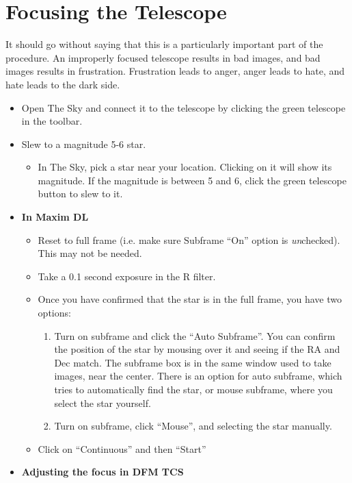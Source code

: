 \documentclass[letterpaper, 12pt]{report}
\begin{document}
\newpage

\chapter{Focusing the Telescope}
\label{ch:focusing}
It should go without saying that this is a particularly important part of the procedure. An improperly focused telescope results in bad images, and bad images results in frustration. Frustration leads to anger, anger leads to hate, and hate leads to the dark side.

\begin{itemize}
	\item Open The Sky and connect it to the telescope by clicking the green telescope in the toolbar.
	\item Slew to a magnitude 5-6 star.
	\begin{itemize}
		\item In The Sky, pick a star near your location. Clicking on it will show its magnitude. If the magnitude is between 5 and 6, click the green telescope button to slew to it.
	\end{itemize}
	\item {\large \textbf{In Maxim DL}}
	\begin{itemize}
		\item Reset to full frame (i.e. make sure Subframe ``On'' option is \emph{un}checked). This may not be needed.
		\item Take a 0.1 second exposure in the R filter.
	\end{itemize}
	\begin{itemize}
		\item Once you have confirmed that the star is in the full frame, you have two options:
		\begin{enumerate}
			\item Turn on subframe and click the ``Auto Subframe''. You can confirm the position of the star by mousing over it and seeing if the RA and Dec match. The subframe box is in the same window used to take images, near the center. There is an option for auto subframe, which tries to automatically find the star, or mouse subframe, where you select the star yourself.
			\item Turn on subframe, click ``Mouse'', and selecting the star manually.
		\end{enumerate}
		\item Click on ``Continuous'' and then ``Start''
	\end{itemize}
	\item {\large \textbf{Adjusting the focus in DFM TCS}}

\end{itemize}
\end{document}
